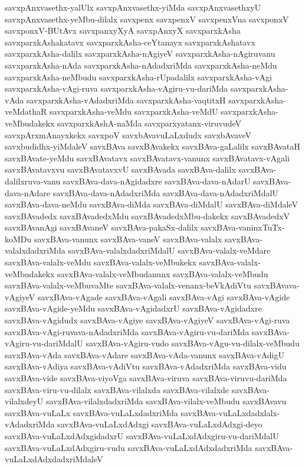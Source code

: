 {savxpAnxvasethx-yalUlx
savxpAnxvasethx-yiMda
savxpAnxvasethxyU
savxpAnxvasethx-yeMbu-dilalx
savxpenx
savxpenxV
savxpenxVna
savxponxV
savxponxV-BUtAvx
savxpanxyXyA
savxpAnxyX
savxparxkAsha
savxparxkAshakatavx
savxparxkAsha-ceYtanayx
savxparxkAshatavx
savxparxkAsha-dalilx
savxparxkAsha-nAgiyeV
savxparxkAsha-nAgiruvanu
savxparxkAsha-nAda
savxparxkAsha-nAdadxriMda
savxparxkAsha-neMdu
savxparxkAsha-neMbudu
savxparxkAsha-rUpadalilx
savxparxkAsha-vAgi
savxparxkAsha-vAgi-ruva
savxparxkAsha-vAgiru-vu-dariMda
savxparxkAsha-vAda
savxparxkAsha-vAdadxriMda
savxparxkAsha-vaqtitxH
savxparxkAsha-veMdathaR
savxparxkAsha-veMdu
savxparxkAsha-veMdU
savxparxkAsha-veMbudakekx
savxparxkAshA-naMda
savxparxyatanx-viruvudeV
savxpArxmAnayxkekx
savxpoV
savxbAvavuLaLxdudx
savxbAvaveV
savxbudidhx-yiMdaleV
savxBAva
savxBAvakekx
savxBAva-gaLalilx
savxBAvataH
savxBAvate-yeMdu
savxBAvatavx
savxBAvatavx-vanunx
savxBAvatavx-vAgali
savxBAvatavxvu
savxBAvatavxvU
savxBAvada
savxBAva-dalilx
savxBAva-dalilxruva-vanu
savxBAva-dava-nAgidadxre
savxBAva-dava-nAdarU
savxBAva-dava-nAdare
savxBAva-dava-nAdadxriMda
savxBAva-dava-nAdadxriMdalU
savxBAva-dava-neMdu
savxBAva-diMda
savxBAva-diMdalU
savxBAva-diMdaleV
savxBAvadedx
savxBAvadedxMdu
savxBAvadedxMbu-dakekx
savxBAvadedxV
savxBAvanAgi
savxBAvaneV
savxBAva-pakaSx-dalilx
savxBAva-vaninxTuTx-koMDu
savxBAva-vanunx
savxBAva-vaneV
savxBAva-valalx
savxBAva-valalxdadxriMda
savxBAva-valalxdadxriMdalU
savxBAva-valalx-veMdare
savxBAva-valalx-veMdu
savxBAva-valalx-veMbukekx
savxBAva-valalx-veMbudakekx
savxBAva-valalx-veMbudanunx
savxBAva-valalx-veMbudu
savxBAva-valalx-veMbuvaMte
savxBAva-valalx-venanx-beVkAdiVtu
savxBAvava-vAgiyeV
savxBAva-vAgade
savxBAva-vAgali
savxBAva-vAgi
savxBAva-vAgide
savxBAva-vAgide-yeMdu
savxBAva-vAgidadxrU
savxBAva-vAgidadxre
savxBAva-vAgidudx
savxBAva-vAgiye
savxBAva-vAgiyeV
savxBAva-vAgi-ruva
savxBAva-vAgi-ruvava-nAdadxriMda
savxBAva-vAgiru-vu-dariMda
savxBAva-vAgiru-vu-dariMdalU
savxBAva-vAgiru-vudo
savxBAva-vAgu-vu-dilalx-veMbudu
savxBAva-vAda
savxBAva-vAdare
savxBAva-vAda-vanunx
savxBAva-vAdigU
savxBAva-vAdiya
savxBAva-vAdiVtu
savxBAva-vAdadxriMda
savxBAva-vidu
savxBAva-vide
savxBAva-viyoVga
savxBAva-viruva
savxBAva-viruvu-dariMda
savxBAva-viru-vu-dilalx
savxBAva-vilalxda
savxBAva-vilalxde
savxBAva-vilalxdeyU
savxBAva-vilalxdadxriMda
savxBAva-vilalx-veMbudu
savxBAvavu
savxBAva-vuLaLx
savxBAva-vuLaLxdadxriMda
savxBAva-vuLaLxdadxlalx-vAdadxriMda
savxBAva-vuLaLxdAdxgi
savxBAva-vuLaLxdAdxgi-deyo
savxBAva-vuLaLxdAdxgidadxrU
savxBAva-vuLaLxdAdxgiru-vu-dariMdalU
savxBAva-vuLaLxdAdxgiru-vudu
savxBAva-vuLaLxdAdxdadxriMda
savxBAva-vuLaLxdAdxdadxriMdaleV
}
